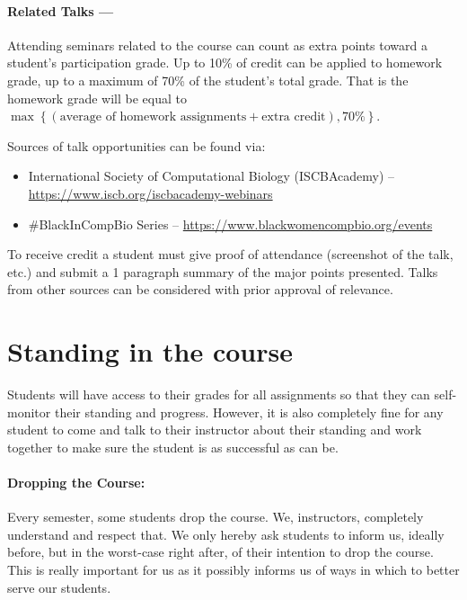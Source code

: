 \documentclass[12pt]{scrartcl}
\begin{document}
\paragraph{Related Talks ---} Attending seminars related to the course can count as extra points toward a student's participation grade. 
Up to 10\% of credit can be applied to homework grade, up to a maximum of 70\% of the student's total grade.
That is the homework grade will be equal to $\displaystyle\max\left\{\left(\textrm{average of homework assignments} + \textrm{extra credit} \right),70\%\right\}$.


Sources of talk opportunities can be found via: 
\begin{itemize}
\item International Society of Computational Biology (ISCBAcademy) -- \\\url{https://www.iscb.org/iscbacademy-webinars}
\item \#BlackInCompBio Series -- \url{https://www.blackwomencompbio.org/events}
\end{itemize}
To receive credit a student must give proof of attendance (screenshot of the talk, etc.) and submit a 1 paragraph summary of the major points presented. 
Talks from other sources can be considered with prior approval of relevance. 

\section{Standing in the course}

Students will have access to their grades for all assignments so that they can self-monitor their standing and progress. 
However, it is also completely fine for any student to come and talk to their instructor about their standing and work together to make sure the student is as successful as can be.

\paragraph{Dropping the Course:} 
Every semester, some students drop the course. We, instructors, completely understand and respect that. We only hereby ask students to inform us, ideally before, but in the worst-case right after, of their intention to drop the course. This is really important for us as it possibly informs us of ways in which to better serve our students.
\end{document}
